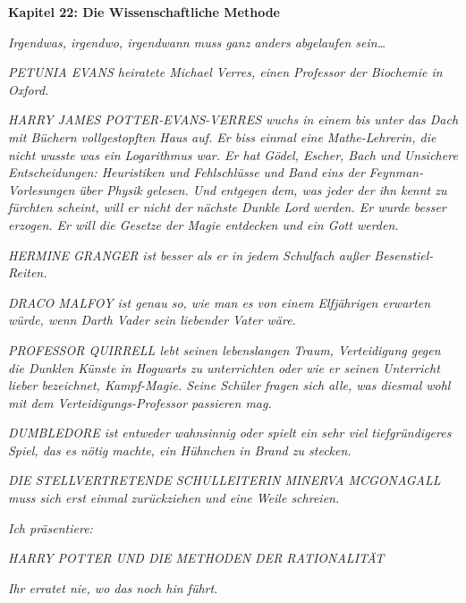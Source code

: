 

\hypertarget{die-wissenschaftliche-methode}{%

\textbf{Kapitel 22: Die Wissenschaftliche Methode\\ }

\emph{\emph{Irgendwas, irgendwo, irgendwann muss ganz anders abgelaufen sein…}}

\emph{PETUNIA EVANS heiratete Michael Verres, einen Professor der Biochemie in Oxford.}

\emph{HARRY JAMES POTTER-EVANS-VERRES wuchs in einem bis unter das Dach mit Büchern vollgestopften Haus auf. Er biss einmal eine Mathe-Lehrerin, die nicht wusste was ein Logarithmus war. Er hat} \emph{\emph{Gödel, Escher, Bach}} \emph{und} \emph{\emph{Unsichere Entscheidungen: Heuristiken und Fehlschlüsse}} \emph{und Band eins der} \emph{\emph{Feynman-Vorlesungen über Physik}} \emph{gelesen. Und entgegen dem, was jeder der ihn kennt zu fürchten scheint, will er nicht der nächste Dunkle Lord werden. Er wurde besser erzogen. Er will die Gesetze der Magie entdecken und ein Gott werden.}

\emph{HERMINE GRANGER ist besser als er in jedem Schulfach außer Besenstiel-Reiten.}

\emph{DRACO MALFOY ist genau so, wie man es von einem Elfjährigen erwarten würde, wenn Darth Vader sein liebender Vater wäre.}

\emph{PROFESSOR QUIRRELL lebt seinen lebenslangen Traum, Verteidigung gegen die Dunklen Künste in Hogwarts zu unterrichten oder wie er seinen Unterricht lieber bezeichnet, Kampf-Magie. Seine Schüler fragen sich alle, was diesmal wohl mit dem Verteidigungs-Professor passieren mag.}

\emph{DUMBLEDORE ist entweder wahnsinnig oder spielt ein sehr viel tiefgründigeres Spiel, das es nötig machte, ein Hühnchen in Brand zu stecken.}

\emph{DIE STELLVERTRETENDE SCHULLEITERIN MINERVA MCGONAGALL muss sich erst einmal zurückziehen und eine Weile schreien.}

\emph{Ich präsentiere:}

\emph{HARRY POTTER UND DIE METHODEN DER RATIONALITÄT}

\emph{Ihr erratet nie, wo das noch hin führt.}

}

